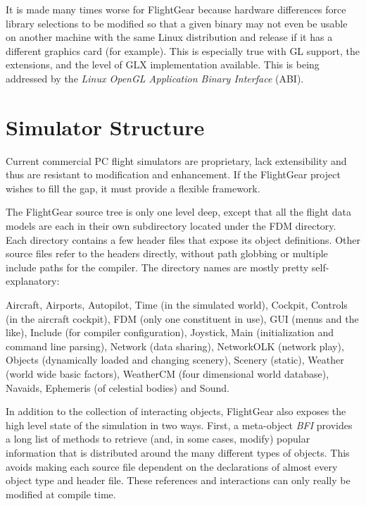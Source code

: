 \documentclass[a4paper,10pt]{article}
\begin{document}
It is made many times worse for FlightGear because
hardware differences force library selections
to be modified so that a given binary may not even be usable on
another machine with the same Linux distribution and release
if it has a different graphics card (for example).
This is especially true with GL support, the extensions, and the
level of GLX implementation available.  This is being addressed
by the \textsl{Linux OpenGL Application Binary Interface}
(ABI)\cite{abi}.
%
%
\section*{Simulator Structure}
%
Current commercial PC flight simulators are proprietary,
lack extensibility and thus are resistant to
modification and enhancement.  If the FlightGear project
wishes to fill the gap, it must provide a flexible framework.


The FlightGear source tree is only one level
deep, except that all the flight data models are each in
their own subdirectory located under the
FDM directory.
Each directory contains a few header files that expose its object
definitions.  Other source files refer to the headers directly,
without path globbing or multiple include paths for the compiler.
The directory names are mostly pretty self-explanatory:

Aircraft,
Airports,
Autopilot,
Time (in the simulated world),
Cockpit,
Controls (in the aircraft cockpit),
FDM (only one constituent in use),
GUI (menus and the like),
Include (for compiler configuration),
Joystick,
Main (initialization and command line parsing),
Network (data sharing),
NetworkOLK (network play),
Objects (dynamically loaded and changing scenery),
Scenery (static),
Weather (world wide basic factors),
WeatherCM (four dimensional world database),
Navaids,
Ephemeris (of celestial bodies) and
Sound.

In addition to the collection of interacting objects, FlightGear
also exposes the high level state of the simulation in two ways.
First, a meta-object \textsl{BFI} provides a long list of
methods to retrieve (and, in some cases, modify) popular information that
is distributed around the many different types of objects.
This avoids making each source file dependent on the declarations
of almost every object type and header file.  These references
and interactions can only really be modified at compile time.
\end{document}
